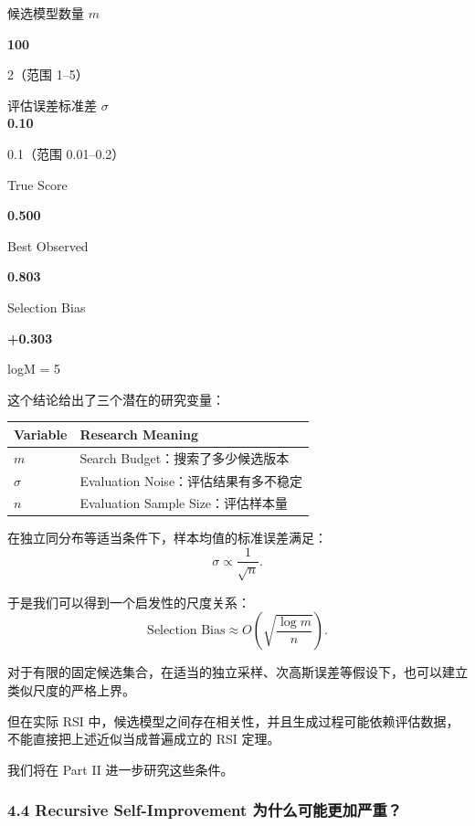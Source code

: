 候选模型数量 \(m\)

\textbf{100}

2（范围 1--5）

评估误差标准差 \(\sigma\)\\
\textbf{0.10}

0.1（范围 0.01--0.2）

True Score

\textbf{0.500}

Best Observed

\textbf{0.803}

Selection Bias

\textbf{+0.303}


logM = 5


这个结论给出了三个潜在的研究变量：

\begin{readertable}
\begin{longtable}[]{@{}
  >{\raggedright\arraybackslash}p{}
  >{\raggedright\arraybackslash}p{}@{}}
\toprule
Variable & Research Meaning \\
\midrule
\endhead
\(m\) & Search Budget：搜索了多少候选版本 \\
\(\sigma\) & Evaluation Noise：评估结果有多不稳定 \\
\(n\) & Evaluation Sample Size：评估样本量 \\
\bottomrule
\end{longtable}
\end{readertable}

在独立同分布等适当条件下，样本均值的标准误差满足：
\[\sigma\propto\frac{1}{\sqrt n}.\]

于是我们可以得到一个启发性的尺度关系：
\[\text{Selection Bias}
\approx
O\left(
\sqrt{\frac{\log m}{n}}
\right).\]

对于有限的固定候选集合，在适当的独立采样、次高斯误差等假设下，也可以建立类似尺度的严格上界。

但在实际 RSI 中，候选模型之间存在相关性，并且生成过程可能依赖评估数据，不能直接把上述近似当成普遍成立的 RSI 定理。

我们将在 Part II 进一步研究这些条件。

\hypertarget{part-1-03-0001-recursive-self-improvement-ux4e3aux4ec0ux4e48ux53efux80fdux66f4ux52a0ux4e25ux91cd}{%
\subsubsection{4.4 Recursive Self-Improvement 为什么可能更加严重？}\label{part-1-03-0001-recursive-self-improvement-ux4e3aux4ec0ux4e48ux53efux80fdux66f4ux52a0ux4e25ux91cd}}

